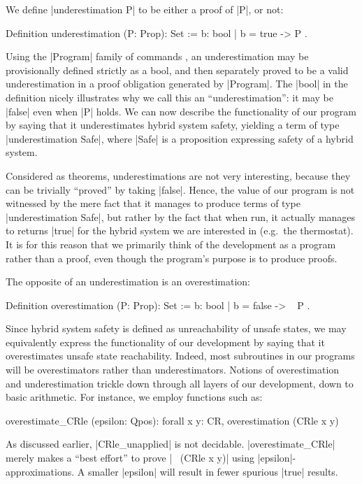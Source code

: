 \documentclass[runningheads]{llncs}
\begin{document}
We define |underestimation P| to be either a proof of |P|, or not:
\begin{code}
Definition underestimation (P: Prop): Set := { b: bool | b = true -> P }.
\end{code}
Using the |Program| family of commands
\cite{sozeau}, an underestimation may be
provisionally defined strictly as a bool, and then separately proved
to be a valid underestimation in a proof obligation generated by
|Program|. The |bool| in the definition nicely illustrates why we call this an
``underestimation'': it may be |false| even when |P| holds. We can now
describe the functionality of our program by saying that it
underestimates hybrid system safety, yielding a term of type
|underestimation Safe|, where |Safe| is a proposition expressing
safety of a hybrid system.

Considered as theorems, underestimations are not very interesting,
because they can be trivially ``proved'' by taking
|false|. Hence, the value of our program is not witnessed by
the mere fact that it manages to produce terms of type
|underestimation Safe|, but rather by the fact that when run, it
actually manages to returns |true| for the hybrid system we
are interested in (e.g.\ the thermostat). It is for this reason that
we primarily think of the development as a program rather than a
proof, even though the program's purpose is to produce proofs.

The opposite of an underestimation is an overestimation:
\begin{code}
Definition overestimation (P: Prop): Set := { b: bool | b = false -> ~ P }.
\end{code}

Since hybrid system safety is defined as unreachability of unsafe
states, we may equivalently express the functionality of our
development by saying that it overestimates unsafe state
reachability. Indeed, most subroutines in our programs will be
overestimators rather than underestimators. Notions of overestimation
and underestimation trickle down through all layers of our
development, down to basic arithmetic. For instance, we employ
functions such as:



\begin{code}
overestimate_CRle (epsilon: Qpos): forall x y: CR, overestimation (CRle x y)
\end{code}
As discussed earlier, |CRle_unapplied| is not
decidable. |overestimate_CRle| merely makes a ``best effort'' to prove
|~ (CRle x y)| using |epsilon|-approximations. A smaller |epsilon|
will result in fewer spurious |true| results.
\end{document}

